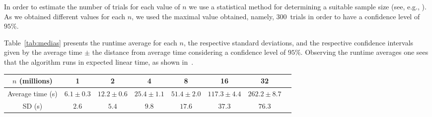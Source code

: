 In order to estimate the number of trials for each value of $n$ we use
a statistical method for determining a suitable sample size (see, e.g.,
\cite[Chapter 13]{j91}).  
As we obtained different values for each $n$, 
we used the maximal value obtained, namely, 300~trials in order to have 
a confidence level of $95\%$.
 

Table~\ref{tab:medias} presents the runtime average for each $n$,
the respective standard deviations, and 
the respective confidence intervals given by 
the average time $\pm$ the distance from average time
considering a confidence level of $95\%$.
Observing the runtime averages one sees that 
the algorithm runs in expected linear time, 
as shown in~\cite{bkz05}. 

\vspace{-2mm}
\begin{table*}[htb]
\begin{center}
{\scriptsize
\begin{tabular}{|c|c|c|c|c|c|c|c|}
\hline
$n$ (millions)  & 1                 & 2                    & 4                  & 8                  & 16      & 32 \\
\hline
Average time (s)& $6.1 \pm 0.3$ & $12.2 \pm 0.6$   & $25.4 \pm 1.1$ & $51.4 \pm 2.0$ & $117.3 \pm 4.4$ & $262.2 \pm 8.7$\\
SD (s)          & $2.6$           & $5.4$              & $9.8$            & $17.6$           & $37.3$            & $76.3$  \\
\hline
\end{tabular}
\vspace{-1mm}
}
\end{center}
\caption{Internal memory based algorithm: average time in seconds for constructing a MPHF,
the standard deviation (SD), and the confidence intervals considering
a confidence level of $95\%$.}
\label{tab:medias}
\vspace{-4mm}
\end{table*}

